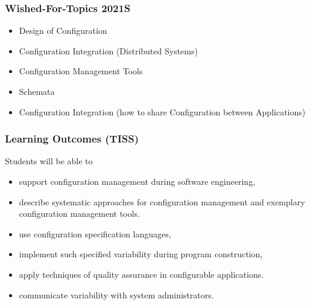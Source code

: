 \begin{frame}
	\frametitle{Wished-For-Topics 2021S}
	\begin{itemize}
	\item Design of Configuration 
	\item Configuration Integration (Distributed Systems)
	\item Configuration Management Tools
	\item Schemata
	\item Configuration Integration (how to share Configuration between Applications)
	\end{itemize}
\end{frame}



\begin{frame}
	\frametitle{Learning Outcomes (TISS)}
	Students will be able to

	\begin{itemize}
	\item support configuration management during software engineering,
	\item describe systematic approaches for configuration management and exemplary configuration management tools.
	\item use configuration specification languages,
	\item implement such specified variability during program construction,
	\item apply techniques of quality assurance in configurable applications.
	\item communicate variability with system administrators.
	\end{itemize}
\end{frame}


